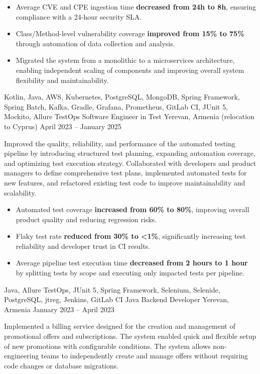\begin{works}
{            \begin{itemize}
                \item {
                    Average CVE and CPE ingestion time \textbf{decreased from 24h to 8h}, ensuring compliance with a 24-hour security SLA.
                }
                \item {
                    Class/Method-level vulnerability coverage \textbf{improved from 15\% to 75\%} through automation of data collection and analysis.
                }
                \item {
                    Migrated the system from a monolithic to a microservices architecture, enabling independent scaling of components and improving overall system flexibility and maintainability.
                }
            \end{itemize}
        }
        {
            Kotlin, Java, AWS, Kubernetes, PostgreSQL, MongoDB, Spring Framework, Spring Batch, Kafka, Gradle, Grafana, Prometheus, GitLab CI, JUnit 5, Mockito, Allure TestOps
        }
    \work
        {Software Engineer in Test} {} {Yerevan, Armenia (relocation to Cyprus)} {April 2023 -- January 2025}
        {
            Improved the quality, reliability, and performance of the automated testing pipeline by introducing structured test planning, \mbox{expanding} automation coverage, and optimizing test execution strategy. Collaborated with developers and product managers to define comprehensive test plans, implemented automated tests for new features, and refactored existing test code to improve maintainability and scalability.
        
            \begin{itemize}
                \item {
                    Automated test coverage \textbf{increased from 60\% to 80\%}, improving overall product quality and reducing regression risks.
                }
                \item {
                    Flaky test rate \textbf{reduced from 30\% to <1\%}, significantly increasing test reliability and developer trust in CI results.
                }
                \item {
                    Average pipeline test execution time \textbf{decreased from 2 hours to 1 hour} by splitting tests by scope and executing only \mbox{impacted} tests per pipeline.
                }
            \end{itemize}
        }
        {
            Java, Allure TestOps, JUnit 5, Spring Framework, Selenium, Selenide, PostgreSQL, jtreg, Jenkins, GitLab CI
        }
    \work
        {Java Backend Developer} {} {Yerevan, Armenia} {January 2023 -- April 2023}
        {
            Implemented a billing service designed for the creation and management of promotional offers and subscriptions. The \mbox{system} enabled quick and flexible setup of new promotions with configurable conditions. The system allows non-engineering teams to independently create and manage offers without requiring code changes or database migrations.
        
}
\end{works}
